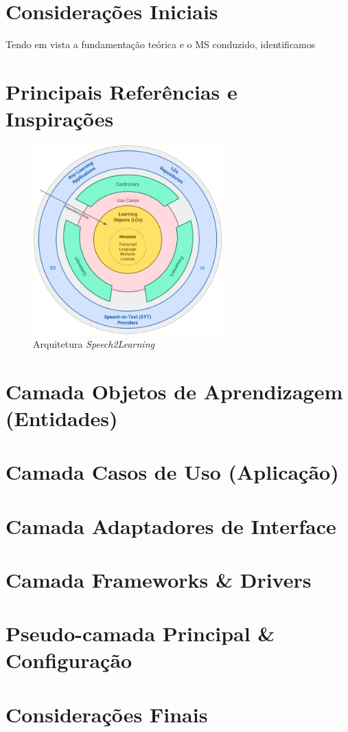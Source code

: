 \section{Considerações Iniciais}

Tendo em vista a fundamentação teórica e o MS conduzido, identificamos 

\section{Principais Referências e Inspirações}

\begin{figure}[htb]
\centering
\caption{Arquitetura \textit{Speech2Learning}}
\label{fig:chapter3-speech2learning-arch}
\includegraphics[width=0.65\textwidth]{images/chapter3-speech2learning-arch.png}
\end{figure}

\section{Camada Objetos de Aprendizagem (Entidades)}
\section{Camada Casos de Uso (Aplicação)}
\section{Camada Adaptadores de Interface}
\section{Camada Frameworks \& Drivers}
\section{Pseudo-camada Principal \& Configuração}

\section{Considerações Finais}